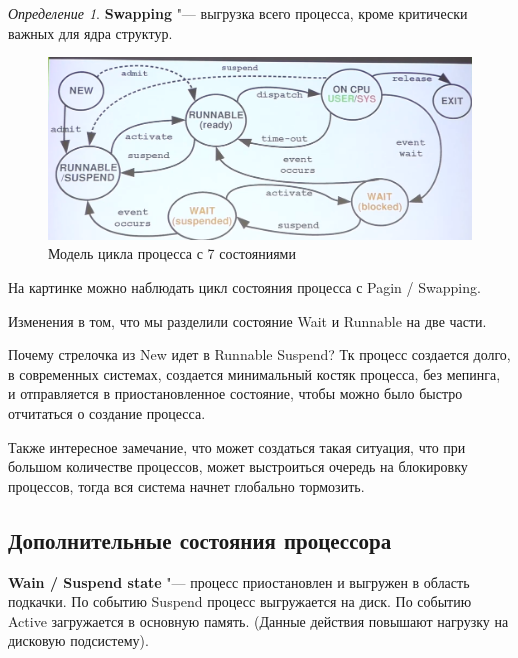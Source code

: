 \documentclass[bachelor, och, book]{SCWorks}
\theoremstyle{remark}
\newtheorem{definition}{Определение}
\begin{document}
    \begin{definition}
        \textbf{Swapping} "--- выгрузка всего процесса, кроме критически важных для ядра структур.
    \end{definition}

    \begin{figure}[H]
        \begin{center}
            \includegraphics[scale=0.3]{res/model-of-process-with-7-states.png}
            \caption{Модель цикла процесса с 7 состояниями}
        \end{center}
    \end{figure}

    На картинке можно наблюдать цикл состояния процесса с Pagin / Swapping. 

    Изменения в том, что мы разделили состояние Wait и Runnable на две части.

    Почему стрелочка из New идет в Runnable Suspend? Тк процесс создается долго, в современных системах, создается минимальный костяк процесса, без мепинга, и отправляется в приостановленное состояние, чтобы можно было быстро отчитаться о создание процесса.
    
    Также интересное замечание, что может создаться такая ситуация, что при большом количестве процессов, может выстроиться очередь на блокировку процессов, тогда вся система начнет глобально тормозить.

    \subsection{Дополнительные состояния процессора}
   
    \hfill \break
    \textbf{Wain / Suspend state} "--- процесс приостановлен и выгружен в область подкачки. По событию Suspend процесс выгружается на диск. По событию Active загружается в основную память. (Данные действия повышают нагрузку на дисковую подсистему).
\end{document}
